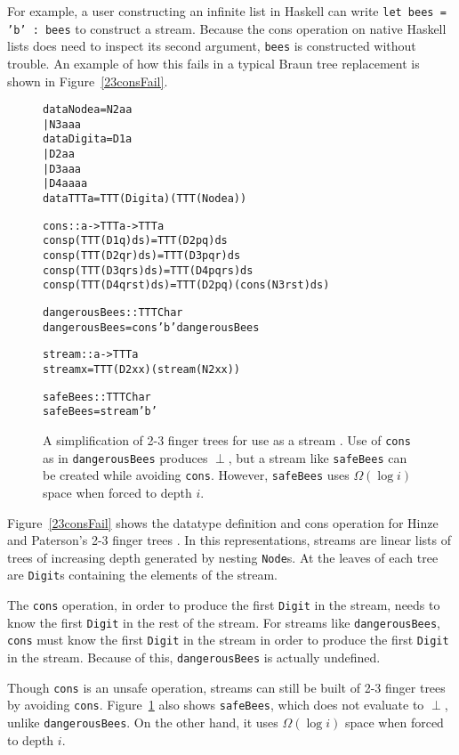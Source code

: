 \documentclass{llncs}
\begin{document}
For example, a user constructing an infinite list in Haskell can write {\tt let bees = 'b' : bees} to construct a stream.
Because the cons operation on native Haskell lists does need to inspect its second argument, {\tt bees} is constructed without trouble.
An example of how this fails in a typical Braun tree replacement is shown in Figure~\ref{23consFail}.

\begin{figure}
\begin{alltt}
data Node a = N2 a a
            | N3 a a a
data Digit a = D1 a
             | D2 a a
             | D3 a a a
             | D4 a a a a
data TTT a = TTT (Digit a) (TTT (Node a))

cons :: a -> TTT a -> TTT a
cons p (TTT (D1 q)       ds) = TTT (D2 p q) ds
cons p (TTT (D2 q r)     ds) = TTT (D3 p q r) ds
cons p (TTT (D3 q r s)   ds) = TTT (D4 p q r s) ds
cons p (TTT (D4 q r s t) ds) = TTT (D2 p q) (cons (N3 r s t) ds)

dangerousBees :: TTT Char
dangerousBees = cons 'b' dangerousBees

stream :: a -> TTT a
stream x = TTT (D2 x x) (stream (N2 x x))

safeBees :: TTT Char
safeBees = stream 'b'
\end{alltt}
\caption{
A simplification of 2-3 finger trees for use as a stream \cite{HinzePat}. 
Use of {\tt cons} as in {\tt dangerousBees} produces $\perp$, but a stream like {\tt safeBees} can be created while avoiding {\tt cons}.
However, {\tt safeBees} uses $\Omega(\log i)$ space when forced to depth $i$.
}
\label{23consFail}
\label{23stream}
\end{figure}

Figure~\ref{23consFail} shows the datatype definition and cons operation for Hinze and Paterson's 2-3 finger trees \cite{HinzePat}.
In this representations, streams are linear lists of trees of increasing depth generated by nesting {\tt Node}s.
At the leaves of each tree are {\tt Digit}s containing the elements of the stream.

The {\tt cons} operation, in order to produce the first {\tt Digit} in the stream, needs to know the first {\tt Digit} in the rest of the stream.
For streams like {\tt dangerousBees}, {\tt cons} must know the first {\tt Digit} in the stream in order to produce the first {\tt Digit} in the stream.
Because of this, {\tt dangerousBees} is actually undefined.

Though {\tt cons} is an unsafe operation, streams can still be built of 2-3 finger trees by avoiding {\tt cons}.
Figure~\ref{23stream} also shows {\tt safeBees}, which does not evaluate to $\perp$, unlike {\tt dangerousBees}.
On the other hand, it uses $\Omega(\log i)$ space when forced to depth $i$.
\end{document}
